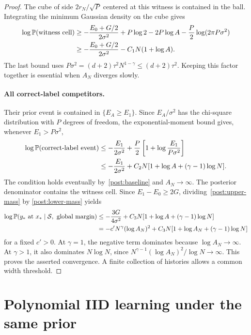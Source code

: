\begin{proof}
The cube of side $2r_N/\sqrt P$ centered at this witness is contained in
the ball. Integrating the minimum Gaussian density on the cube gives
\begin{align}
 \log\mathbb P(\text{witness cell})
 &\ge-\frac{E_0+G/2}{2\sigma^2}
       +P\log2-2P\log A-\frac P2\log(2\pi P\sigma^2)\nonumber\\
 &\ge-\frac{E_0+G/2}{2\sigma^2}-C_1N(1+\log A).
 \label{post:lower-mass}
\end{align}
The last bound uses
$P\sigma^2=(d+2)\tau^2N^{1-\gamma}\le(d+2)\tau^2$.
Keeping this factor together is essential when $A_N$ diverges slowly.

\paragraph{All correct-label competitors.}
Their prior event is contained in $\{E_A\ge E_1\}$. Since
$E_A/\sigma^2$ has the chi-square distribution with $P$ degrees of freedom,
the exponential-moment bound gives, whenever $E_1>P\sigma^2$,
\begin{align}
 \log\mathbb P(\text{correct-label event})
 &\le-\frac{E_1}{2\sigma^2}
       +\frac P2\left[1+\log\frac{E_1}{P\sigma^2}\right]\nonumber\\
 &\le-\frac{E_1}{2\sigma^2}
       +C_2N[1+\log A+(\gamma-1)\log N].
 \label{post:upper-mass}
\end{align}
The condition holds eventually by~\eqref{post:baseline} and $A_N\to\infty$.
The posterior denominator contains the witness cell. Since
$E_1-E_0\ge2G$, dividing~\eqref{post:upper-mass} by
\eqref{post:lower-mass} yields
\begin{align}
 \log\mathbb P(y_*\text{ at }x_*\mid\mathcal S,\text{ global margin})
 &\le-\frac{3G}{4\sigma^2}
       +C_3N[1+\log A+(\gamma-1)\log N]\nonumber\\
 &=-c' N^\gamma(\log A_N)^2
       +C_3N[1+\log A_N+(\gamma-1)\log N]
 \label{post:ratio}
\end{align}
for a fixed $c'>0$.
At $\gamma=1$, the negative term dominates because $\log A_N\to\infty$.
At $\gamma>1$, it also dominates $N\log N$, since
$N^{\gamma-1}(\log A_N)^2/\log N\to\infty$.
This proves the asserted convergence. A finite collection of histories
allows a common width threshold.
\end{proof}

\section{Polynomial IID learning under the same prior}
\label{post:iid-section}

